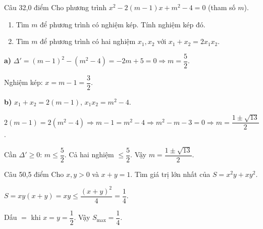 \begin{de_cau}{Câu 3}{2,0 điểm}
Cho phương trình $x^2-2(m-1)x+m^2-4=0$ (tham số $m$).
\begin{enumerate}[label=\alph*)]
  \item Tìm $m$ để phương trình có nghiệm kép. Tính nghiệm kép đó.
  \item Tìm $m$ để phương trình có hai nghiệm $x_1,x_2$ với $x_1+x_2=2x_1x_2$.
\end{enumerate}
\end{de_cau}

\begin{loi_giai_cau}
\textbf{a)} $\Delta'=(m-1)^2-(m^2-4)=-2m+5=0\Rightarrow m=\dfrac{5}{2}$.

Nghiệm kép: $x=m-1=\boxed{\dfrac{3}{2}}$.

\textbf{b)} $x_1+x_2=2(m-1)$, $x_1x_2=m^2-4$.

$2(m-1)=2(m^2-4)\Rightarrow m-1=m^2-4\Rightarrow m^2-m-3=0\Rightarrow m=\dfrac{1\pm\sqrt{13}}{2}$.

Cần $\Delta'\ge0$: $m\le\dfrac{5}{2}$. Cả hai nghiệm $\le\dfrac{5}{2}$. Vậy $\boxed{m=\dfrac{1\pm\sqrt{13}}{2}}$.
\end{loi_giai_cau}

\begin{de_cau}{Câu 5}{0,5 điểm}
Cho $x, y > 0$ và $x + y = 1$. Tìm giá trị lớn nhất của $S = x^2y + xy^2$.
\end{de_cau}

\begin{loi_giai_cau}
$S=xy(x+y)=xy\le\dfrac{(x+y)^2}{4}=\dfrac{1}{4}$.

Dấu $=$ khi $x=y=\dfrac{1}{2}$. Vậy $S_{\max}=\boxed{\dfrac{1}{4}}$.
\end{loi_giai_cau}
